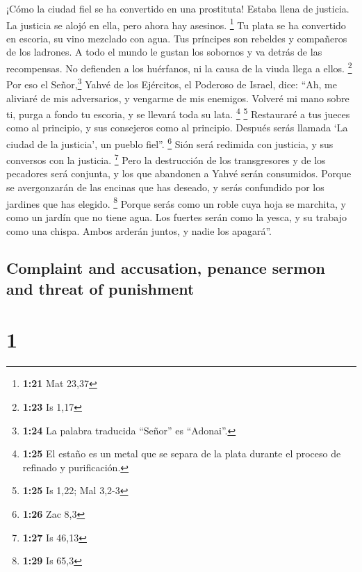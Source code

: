 \begin{paracol}{2}
 ¡Cómo la ciudad fiel se ha convertido en una prostituta!
Estaba llena de justicia. La justicia se alojó en ella, pero ahora hay
asesinos. \footnote{\textbf{1:21} Mat 23,37}  Tu plata se
ha convertido en escoria, su vino mezclado con agua.  Tus
príncipes son rebeldes y compañeros de los ladrones. A todo el mundo le
gustan los sobornos y va detrás de las recompensas. No defienden a los
huérfanos, ni la causa de la viuda llega a ellos. \footnote{\textbf{1:23}
  Is 1,17}  Por eso el Señor,\footnote{\textbf{1:24} La
  palabra traducida ``Señor'' es ``Adonai''.} Yahvé de los Ejércitos, el
Poderoso de Israel, dice: ``Ah, me aliviaré de mis adversarios, y
vengarme de mis enemigos.  Volveré mi mano sobre ti,
purga a fondo tu escoria, y se llevará toda su lata. \footnote{\textbf{1:25}
  El estaño es un metal que se separa de la plata durante el proceso de
  refinado y purificación.} \footnote{\textbf{1:25} Is 1,22; Mal 3,2-3}
 Restauraré a tus jueces como al principio, y sus
consejeros como al principio. Después serás llamada `La ciudad de la
justicia', un pueblo fiel''. \footnote{\textbf{1:26} Zac 8,3}
 Sión será redimida con justicia, y sus conversos con la
justicia. \footnote{\textbf{1:27} Is 46,13}  Pero la
destrucción de los transgresores y de los pecadores será conjunta, y los
que abandonen a Yahvé serán consumidos.  Porque se
avergonzarán de las encinas que has deseado, y serás confundido por los
jardines que has elegido. \footnote{\textbf{1:29} Is 65,3}
 Porque serás como un roble cuya hoja se marchita, y como
un jardín que no tiene agua.  Los fuertes serán como la
yesca, y su trabajo como una chispa. Ambos arderán juntos, y nadie los
apagará''.

\switchcolumn
\begin{otherlanguage}{english}

\hypertarget{complaint-and-accusation-penance-sermon-and-threat-of-punishment}{%
\subsection{Complaint and accusation, penance sermon and threat of
punishment}\label{complaint-and-accusation-penance-sermon-and-threat-of-punishment}}

\hypertarget{section-1}{%
\section{1}\label{section-1}}


\end{otherlanguage}
\end{paracol}
